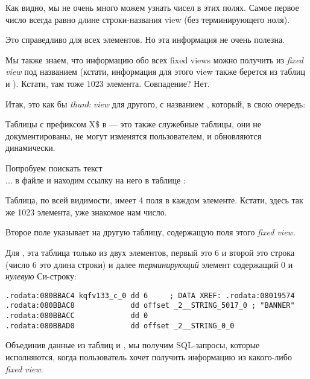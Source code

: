 Как видно, мы не очень много можем узнать чисел в этих полях. Самое первое число всегда равно длине строки-названия view (без терминирующего ноля).

Это справедливо для всех элементов. Но эта информация не очень полезна.

Мы также знаем, что информацию обо всех fixed views можно получить из \emph{fixed view} под названием
(кстати, информация для этого view также берется из таблиц  и ).
Кстати, там тоже 1023 элемента. Совпадение? Нет.



Итак,  это как бы \emph{thunk view} для другого, с названием , который, в свою очередь:



Таблицы с префиксом X\$ в \oracle --- это также служебные таблицы, они не документированы,
не могут изменятся пользователем, и обновляются динамически.

Попробуем поискать текст \\

... в файле  и находим ссылку на него в таблице :



Таблица, по всей видимости, имеет 4 поля в каждом элементе. Кстати, здесь так же 1023 элемента, уже знакомое нам число.

Второе поле указывает на другую таблицу, содержащую поля этого \emph{fixed view}.

Для , эта таблица только из двух элементов, первый это 6 и второй это строка 
 (число 6 это длина строки) и далее \emph{терминирующий} элемент содержащий 0 и \emph{нулевую} 
Си-строку:

\begin{lstlisting}[caption=kqf.o,style=customasmx86]
.rodata:080BBAC4 kqfv133_c_0 dd 6     ; DATA XREF: .rodata:08019574
.rodata:080BBAC8             dd offset _2__STRING_5017_0 ; "BANNER"
.rodata:080BBACC             dd 0
.rodata:080BBAD0             dd offset _2__STRING_0_0
\end{lstlisting}

Объединив данные из таблиц  и , мы получим SQL-запросы, которые исполняются, когда пользователь хочет получить информацию из какого-либо \emph{fixed view}.

